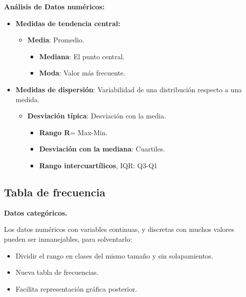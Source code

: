 \textbf{Análisis de Datos numéricos:}

\begin{itemize}
\tightlist
\item
  \textbf{Medidas de tendencia central:}

  \begin{itemize}
  \tightlist
  \item
    \textbf{Media}: Promedio.

    \begin{itemize}
    \tightlist
    \item
      \textbf{Mediana}: El punto central.
    \item
      \textbf{Moda}: Valor más frecuente.
    \end{itemize}
  \end{itemize}
\item
  \textbf{Medidas de dispersión}: Variabilidad de una distribución
  respecto a una medida.

  \begin{itemize}
  \tightlist
  \item
    \textbf{Desviación típica}: Desviación con la media.

    \begin{itemize}
    \tightlist
    \item
      \textbf{Rango R}= Max-Min.
    \item
      \textbf{Desviación con la mediana}: Cuartiles.
    \item
      \textbf{Rango intercuartílicos}, IQR: Q3-Q1
    \end{itemize}
  \end{itemize}
\end{itemize}

\hypertarget{tabla-de-frecuencia}{%
\subsection{Tabla de frecuencia}\label{tabla-de-frecuencia}}

\textbf{Datos categóricos.}

Los datos numéricos con variables continuas, y discretas con muchos
valores pueden ser inmanejables, para solventarlo:

\begin{itemize}
\tightlist
\item
  Dividir el rango en clases del mismo tamaño y sin solapamientos.
\item
  Nueva tabla de frecuencias.
\item
  Facilita representación gráfica posterior.
\end{itemize}

